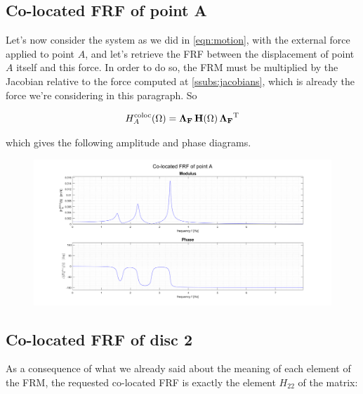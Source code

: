 \documentclass[a4paper,12pt,oneside]{article}
\begin{document}
\vspace{100pt}

\subsection{Co-located FRF of point A}
\label{subs:co-located_a}

Let's now consider the system as we did in \eqref{eqn:motion}, with the external force applied to point $ A $, and let's retrieve the FRF between the displacement of point $ A $ itself and this force. In order to do so, the FRM must be multiplied by the Jacobian relative to the force computed at \ref{ssubs:jacobians}, which is already the force we're considering in this paragraph. So

\[
	H^\textup{coloc}_A(\Omega) =
		\mathbf{\Lambda_F} \, \mathbf{H}(\Omega) \, \mathbf{\Lambda_F}^\textup{T}
\]

\vspace{10pt}

which gives the following amplitude and phase diagrams.

\begin{figure}[H]
	\hspace{-70pt}
	\includegraphics[scale=0.4]{co-located_a}
\end{figure}

\vspace{50pt}

\subsection{Co-located FRF of disc 2}

As a consequence of what we already said about the meaning of each element of the FRM, the requested co-located FRF is exactly the element $ H_{22} $ of the matrix:

\vspace{20pt}
\end{document}
